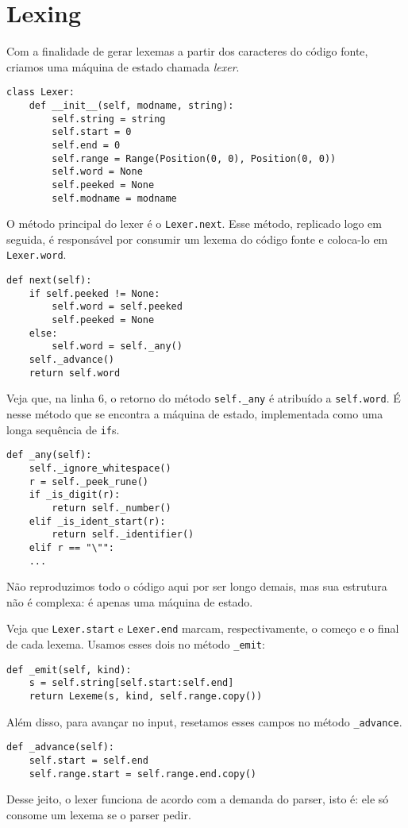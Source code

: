 \section{Lexing}

Com a finalidade de gerar lexemas a partir dos 
caracteres do código fonte, criamos uma máquina de estado
chamada \textit{lexer}.
 

\begin{lstlisting}
class Lexer:
    def __init__(self, modname, string):
        self.string = string
        self.start = 0
        self.end = 0
        self.range = Range(Position(0, 0), Position(0, 0))
        self.word = None
        self.peeked = None
        self.modname = modname
\end{lstlisting}

O método principal do lexer é o \verb|Lexer.next|. Esse método,
replicado logo em seguida, é responsável por consumir um lexema
do código fonte e coloca-lo em \verb|Lexer.word|.

\begin{lstlisting}
def next(self):
    if self.peeked != None:
        self.word = self.peeked
        self.peeked = None
    else:
        self.word = self._any()
    self._advance()
    return self.word
\end{lstlisting}

Veja que, na linha 6, o retorno do método \verb|self._any|
é atribuído a \verb|self.word|. É nesse método que se encontra
a máquina de estado, implementada como uma longa sequência
de \verb|if|s.

\begin{lstlisting}
def _any(self):
    self._ignore_whitespace()
    r = self._peek_rune()
    if _is_digit(r):
        return self._number()
    elif _is_ident_start(r):
        return self._identifier()
    elif r == "\"":
    ...
\end{lstlisting}

\noindent Não reproduzimos todo o código aqui por ser longo
demais, mas sua estrutura não é complexa: é apenas uma máquina
de estado.

Veja que \verb|Lexer.start| e \verb|Lexer.end| marcam,
respectivamente, o começo e o final de cada lexema. Usamos esses
dois no método \verb|_emit|:

\begin{lstlisting}
def _emit(self, kind):
    s = self.string[self.start:self.end]
    return Lexeme(s, kind, self.range.copy())
\end{lstlisting}

\noindent Além disso, para avançar no input,
resetamos esses campos no método \verb|_advance|.

\begin{lstlisting}
def _advance(self):
    self.start = self.end
    self.range.start = self.range.end.copy()
\end{lstlisting}

Desse jeito, o lexer funciona de acordo com a demanda do
parser, isto é: ele só consome um lexema se o parser pedir.